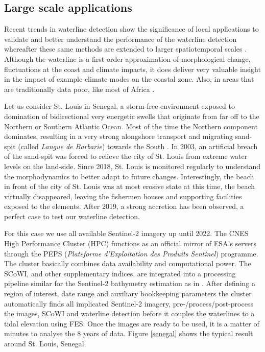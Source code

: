 \documentclass[remotesensing,article,submit,pdftex,moreauthors]{Definitions/mdpi}
\begin{document}
\subsection{Large scale applications}
Recent trends in waterline detection show the significance of local applications to validate and better understand the performance of the waterline detection whereafter these same methods are extended to larger spatiotemporal scales \citep{VOS2019_sub, almar2021global, Vos2023}. Although the waterline is a first order approximation of morphological change, fluctuations at the coast and climate impacts, it does deliver very valuable insight in the impact of example climate modes on the coastal zone. Also, in areas that are traditionally data poor, like most of Africa \citep{almar2022coastal}.  

Let us consider St. Louis in Senegal, a storm-free environment exposed to domination of bidirectional very energetic swells that originate from far off to the Northern or Southern Atlantic Ocean. Most of the time the Northern component dominates, resulting in a very strong alongshore transport and migrating sand-spit (called \textit{Langue de Barbarie}) towards the South \citep{bergsma2020sand, taveneau2021observing}. In 2003, an artificial breach of the sand-spit was forced to relieve the city of St. Louis from extreme water levels on the land-side. Since 2018, St. Louis is monitored regularly to understand the morphodynamics to better adapt to future changes. Interestingly, the beach in front of the city of St. Louis was at most erosive state at this time, the beach virtually disappeared, leaving the fishermen houses and supporting facilities exposed to the elements. After 2019, a strong accretion has been observed, a perfect case to test our waterline detection. 

For this case we use all available Sentinel-2 imagery up until 2022. The CNES High Performance Cluster (HPC) functions as an official mirror of ESA's servers through the PEPS (\textit{Plateforme d'Exploitation des Produits Sentinel}) programme. The cluster basically combines data availability and computational power. The SCoWI, and other supplementary indices, are integrated into a processing pipeline similar for the Sentinel-2 bathymetry estimation as in \citet{daly2022new}. After defining a region of interest, date range and auxiliary bookkeeping parameters the cluster automatically finds all implicated Sentinel-2 imagery, pre-/process/post-process the images, SCoWI and waterline detection before it couples the waterlines to a tidal elevation using FES. Once the images are ready to be used, it is a matter of minutes to analyse the 8 years of data. Figure \ref{senegal} shows the typical result around St. Louis, Senegal.
\end{document}
